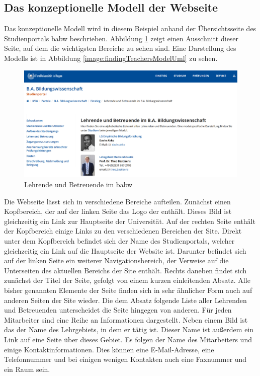 \subsection{Das konzeptionelle Modell der Webseite}
    \label{section:findingsTeachersConceptualModel}
    Das konzeptionelle Modell wird in diesem Beispiel anhand
    der Übersichtsseite des Studienportals \gls{babw} beschrieben.
    Abbildung \ref{image:findingTeachersModelOverview} zeigt einen
    Ausschnitt dieser Seite, auf dem die wichtigsten Bereiche zu sehen sind.
    Eine Darstellung des Modells ist in Abbildung
    \ref{image:findingTeachersModelUml} zu sehen.

    \begin{figure}[htb]
        \centering
        \includegraphics[width=\textwidth]{../resources/findings/case-study-1/model/overview.png}
        \caption{Lehrende und Betreuende im \acrshort{babw}}
        \label{image:findingTeachersModelOverview}
    \end{figure}

    Die Webseite lässt sich in verschiedene Bereiche aufteilen.
    Zunächst einen Kopfbereich, der auf der linken Seite das Logo
    der {\fernUni} enthält.
    Dieses Bild ist gleichzeitig ein Link zur Hauptseite der Universität. 
    Auf der rechten Seite enthält der Kopfbereich einige Links zu den verschiedenen
    Bereichen der Site.
    Direkt unter dem Kopfbereich befindet sich der Name des Studienportals,
    welcher gleichzeitig ein Link auf die Hauptseite der Website ist.
    Darunter befindet sich auf der linken Seite ein weiterer Navigationsbereich,
    der Verweise auf die Unterseiten des aktuellen Bereichs der Site enthält.
    Rechts daneben findet sich zunächst der Titel der Seite,
    gefolgt von einem kurzen einleitenden Absatz.
    Alle bisher genannten Elemente der Seite finden sich in sehr ähnlicher Form
    auch auf anderen Seiten der Site wieder.
    Die dem Absatz folgende Liste aller Lehrenden und Betreuenden unterscheidet die Seite hingegen von anderen.
    Für jeden Mitarbeiter sind eine Reihe an Informationen dargestellt.
    Neben einem Bild ist das der Name des Lehrgebiets, in dem er tätig ist.
    Dieser Name ist außerdem ein Link auf eine Seite über dieses Gebiet.
    Es folgen der Name des Mitarbeiters
    und einige Kontaktinformationen.
    Dies können eine E-Mail-Adresse, eine Telefonnummer
    und bei einigen wenigen Kontakten auch eine Faxnummer und ein Raum sein.


